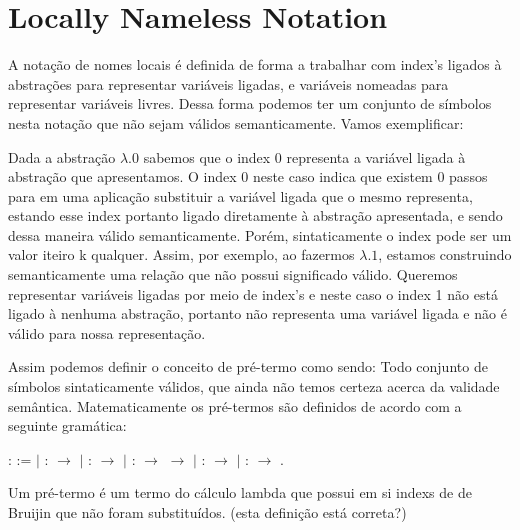 
\begin{coqdoccode}
\coqdocemptyline
\end{coqdoccode}
\section{Locally Nameless Notation}

\begin{coqdoccode}
\coqdocemptyline
\coqdocemptyline
\end{coqdoccode}
A notação de nomes locais é definida de forma a trabalhar com index's ligados à abstrações
para representar variáveis ligadas, e variáveis nomeadas para representar variáveis livres. Dessa
forma podemos ter um conjunto de símbolos nesta notação que não sejam válidos semanticamente. 
Vamos exemplificar: 

 Dada a abstração $\lambda.0$ sabemos que o index 0 representa a variável ligada à abstração
que apresentamos. O index 0 neste caso indica que existem 0 passos para em uma aplicação
substituir a variável ligada que o mesmo representa, estando esse index portanto ligado
diretamente à abstração apresentada, e sendo dessa maneira válido semanticamente. Porém,
sintaticamente o index pode ser um valor iteiro k qualquer. Assim, por exemplo, ao 
fazermos $\lambda.1$, estamos construindo semanticamente uma relação que não possui 
significado válido. Queremos representar variáveis ligadas por meio de index's e neste caso o 
index 1 não está ligado à nenhuma abstração, portanto não representa uma variável ligada
e não é válido para nossa representação.

 Assim podemos definir o conceito de pré-termo como sendo: Todo conjunto de símbolos sintaticamente
válidos, que ainda não temos certeza acerca da validade semântica. Matematicamente os pré-termos 
são definidos de acordo com a seguinte gramática: \begin{coqdoccode}
\coqdocemptyline
\coqdocnoindent
{}  :  :=\coqdoceol
\coqdocindent{1.00em}
\ensuremath{|}  :  \ensuremath{\rightarrow} \coqdoceol
\coqdocindent{1.00em}
\ensuremath{|}  :  \ensuremath{\rightarrow} \coqdoceol
\coqdocindent{1.00em}
\ensuremath{|}   :  \ensuremath{\rightarrow}  \ensuremath{\rightarrow} \coqdoceol
\coqdocindent{1.00em}
\ensuremath{|}   :  \ensuremath{\rightarrow} \coqdoceol
\coqdocindent{1.00em}
\ensuremath{|}   :  \ensuremath{\rightarrow} .\coqdoceol
\coqdocemptyline
\end{coqdoccode}
Um pré-termo é um termo do cálculo lambda que possui em si indexs de de Bruijin que não foram
substituídos. (esta definição está correta?)






